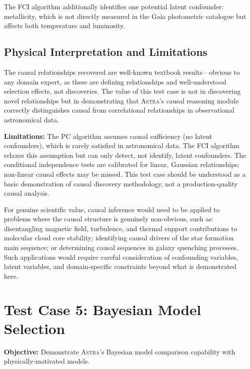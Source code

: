 \documentclass[usenatbib]{rasti}
\newcommand{\astra}{\textsc{Astra}\xspace}
\newcommand{\pc}{PC\xspace}
\newcommand{\fci}{FCI\xspace}
\begin{document}
The \fci algorithm additionally identifies one potential latent confounder: metallicity, which is not directly measured in the Gaia photometric catalogue but affects both temperature and luminosity.

\subsection{Physical Interpretation and Limitations}
\label{sec:tc4:interpretation}

The causal relationships recovered are well-known textbook results---obvious to any domain expert, as these are defining relationships and well-understood selection effects, not discoveries.
The value of this test case is not in discovering novel relationships but in demonstrating that \astra's causal reasoning module correctly distinguishes causal from correlational relationships in observational astronomical data.

\textbf{Limitations:}
The \pc algorithm assumes causal sufficiency (no latent confounders), which is rarely satisfied in astronomical data.
The \fci algorithm relaxes this assumption but can only detect, not identify, latent confounders.
The conditional independence tests are calibrated for linear, Gaussian relationships; non-linear causal effects may be missed.
This test case should be understood as a basic demonstration of causal discovery methodology, not a production-quality causal analysis.

For genuine scientific value, causal inference would need to be applied to problems where the causal structure is genuinely non-obvious, such as: disentangling magnetic field, turbulence, and thermal support contributions to molecular cloud core stability; identifying causal drivers of the star formation main sequence; or determining causal sequences in galaxy quenching processes.
Such applications would require careful consideration of confounding variables, latent variables, and domain-specific constraints beyond what is demonstrated here.

\section{Test Case 5: Bayesian Model Selection}
\label{sec:tc5}

\textbf{Objective:} Demonstrate \astra's Bayesian model comparison capability with physically-motivated models.
\end{document}
